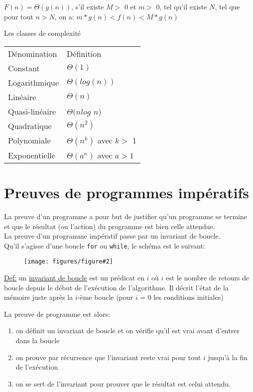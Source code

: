 \documentclass{article}
\newcommand{\schem}[3]
{
	\begin{figure}[ht]
		\centering
		\textbf{#1}\par\medskip
		\texttt{[image: figures/figure\#2]}
		\caption{}
	\end{figure}
}
\newcommand{\code}[1]{\lstinline[style = mystyle]{#1}}
\begin{document}
				$F(n) = \Theta(g(n))$, s'il existe $M >$ 0 et $m >$ 0, tel qu'il existe $N$, tel que pour tout $n > N$, on a: $m * g(n) < f(n) < M * g(n)$

				Les classes de complexité
				\begin{tabular}{ll}
					 Dénomination & Définition\\
					 Constant & $\Theta(1)$\\
					 Logarithmique & $\Theta(log(n))$\\
					 Linéaire & $\Theta(n)$\\
					 Quasi-linéaire & $\Theta(nlog$ $n)$\\
					 Quadratique & $\Theta(n^2)$\\
					 Polynomiale & $\Theta(n^k)$ avec $k >$ 1\\
					 Exponentielle & $\Theta(a^n)$ avec $a > 1$\\
				\end{tabular}

	\section{Preuves de programmes impératifs}

	La preuve d’un programme a pour but de justifier qu’un programme se termine et que le résultat (ou l’action) du programme est bien celle attendue.\\
	La preuve d’un programme impératif passe par un invariant de boucle.\\
	Qu’il s’agisse d’une boucle \code{for} ou \code{while}, le schéma est le suivant:
	
	\schem{}{1}{0.4}
	
	\underline{Def:} un \underline{invariant de boucle} est un prédicat en $i$ où $i$ est le nombre de retours de boucle depuis le début de l’exécution de l’algorithme. Il décrit l’état de la mémoire juste après la $i$-ème boucle (pour $i$ = 0 les conditions initiales)
	
	La preuve de programme est alors:
	\begin{enumerate}
		\item on définit un invariant de boucle et on vérifie qu'il est vrai avant d'entrer dans la boucle
		\item on prouve par récurrence que l'invariant reste vrai pour tout $i$ jusqu'à la fin de l'exécution
		\item on se sert de l'invariant pour prouver que le résultat est celui attendu.
	\end{enumerate}
	
\end{document}
